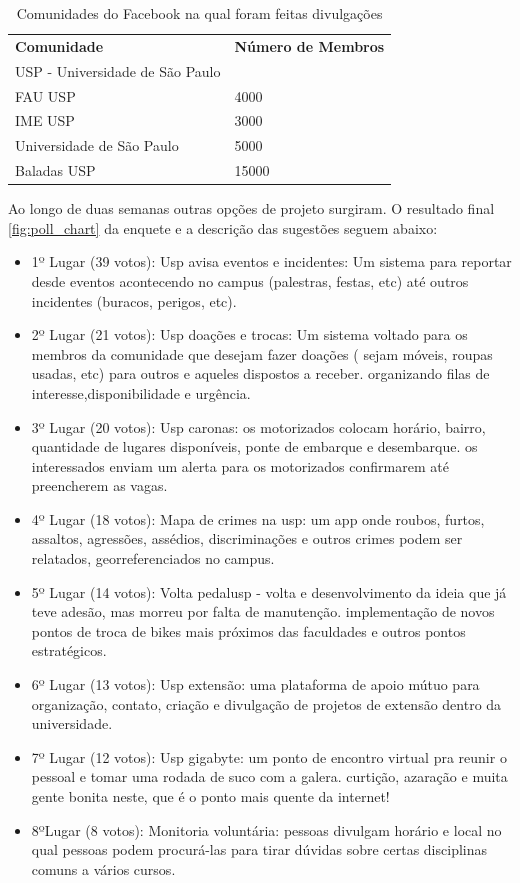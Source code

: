 \begin{table}[]
\centering
\caption{Comunidades do Facebook na qual foram feitas divulgações}
\label{my-label}
\begin{tabular}{ll}
{\color[HTML]{3531FF} \textbf{Comunidade}} & {\color[HTML]{3531FF} \textbf{Número de Membros}} \\
USP - Universidade de São Paulo            &                                                   \\
FAU USP                                    & 4000                                              \\
IME USP                                    & 3000                                              \\
Universidade de São Paulo                  & 5000                                              \\
Baladas USP                                & 15000
\end{tabular}
\end{table}
\par Ao longo de duas semanas outras opções de projeto surgiram. O resultado final \ref{fig:poll_chart} da enquete e a descrição das sugestões seguem abaixo:
\begin{itemize}
\item{ 1º Lugar (39 votos):} Usp avisa eventos e incidentes: Um sistema para reportar desde eventos acontecendo no campus (palestras, festas, etc) até outros incidentes (buracos, perigos, etc).
\item {2º Lugar (21 votos):} Usp doações e trocas: Um sistema voltado para os membros da comunidade que desejam fazer doações ( sejam móveis, roupas usadas, etc) para outros e aqueles dispostos a receber. organizando filas de interesse,disponibilidade e urgência.
\item {3º Lugar (20 votos):} Usp caronas: os motorizados colocam horário, bairro, quantidade de lugares disponíveis, ponte de embarque e desembarque. os interessados enviam um alerta para os motorizados confirmarem até preencherem as vagas.
\item {4º Lugar (18 votos):} Mapa de crimes na usp: um app onde roubos, furtos, assaltos, agressões, assédios, discriminações e outros crimes podem ser relatados, georreferenciados no campus.
\item {5º Lugar (14 votos):} Volta pedalusp - volta e desenvolvimento da ideia que já teve adesão, mas morreu por falta de manutenção. implementação de novos pontos de troca de bikes mais próximos das faculdades e outros pontos estratégicos.
\item {6º Lugar (13 votos): } Usp extensão: uma plataforma de apoio mútuo para organização, contato, criação e divulgação de projetos de extensão dentro da universidade.
\item {7º Lugar (12 votos):} Usp gigabyte: um ponto de encontro virtual pra reunir o pessoal e tomar uma rodada de suco com a galera. curtição, azaração e muita gente bonita neste, que é o ponto mais quente da internet!
\item {8ºLugar (8 votos):} Monitoria voluntária: pessoas divulgam horário e local no qual pessoas podem procurá-las para tirar dúvidas sobre certas disciplinas comuns a vários cursos.
\end{itemize}
